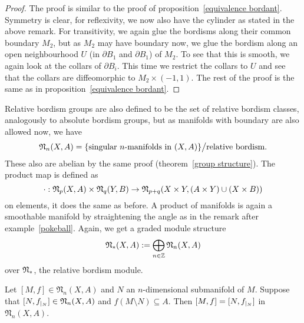 \documentclass[a4paper,11pt]{article}
\begin{document}
\begin{proof}
    The proof is similar to the proof of proposition\ \ref{equivalence bordant}. 
    Symmetry is clear, for reflexivity, we now also have the cylinder as stated in the above remark. 
    For transitivity, we again glue the bordisms along their common boundary \(M_2\), but as \(M_2\) may have boundary now, we glue the bordism along an open neighbourhood \(U\) (in \(\partial B_1\) and \(\partial B_1\)) of \(M_2\). 
    To see that this is smooth, we again look at the collars of \(\partial B_i\). This time we restrict the collars to \(U\) and see that the collars are diffeomorphic to \(M_2\times(-1,1)\). The rest of the proof is the same as in proposition\ \ref{equivalence bordant}. %
\end{proof}

Relative bordism groups are also defined to be the set of relative bordism classes, analogously to absolute bordism groups, but as manifolds with boundary are also allowed now, we have
\[\mathfrak{N}_n(X,A)=\{\text{singular $n$-manifolds in $(X,A)$}\}\big/\text{relative bordism}.\]
These also are abelian by the same proof (theorem\ \ref{group structure}). The product map is defined as \[\cdot:\mathfrak{N}_p(X,A)\times\mathfrak{N}_q(Y,B)\to\mathfrak{N}_{p+q}(X\times Y, (A\times Y)\cup(X\times B))\]
on elements, it does the same as before. A product of manifolds is again a smoothable manifold by straightening the angle as in the remark after example\ \ref{pokeball}. Again, we get a graded module structure
\[\mathfrak{N}_\ast(X,A):= \bigoplus_{n\in\mathbb{Z}}\mathfrak{N}_n(X,A)\]
over \(\mathfrak{N}_\ast\), the relative bordism module.

\begin{lemma}\label{almost excision} %
    Let \([M,f]\in\mathfrak{N}_n(X,A)\) and \(N\) an \(n\)-dimensional submanifold of \(M\). 
    Suppose that \([N,f_{|_{N}}]\in\mathfrak{N}_n(X,A)\) and \(f(M\setminus N)\subseteq A\). 
    Then \([M,f]=[N,f_{|_{N}}]\) in \(\mathfrak{N}_n(X,A)\).
\end{lemma}
\end{document}
